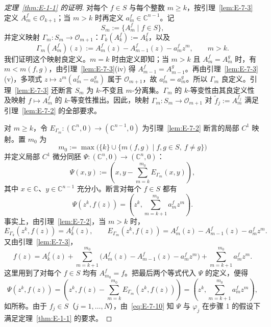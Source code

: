 \begin{proof}[定理~\ref{thm:E-1-1} 的证明]
对每个 $f\in S$ 与每个整数 $m\ge k$，按引理~\ref{lem:E-7-3} 定义 $A_m^f\in\mathcal O_{k+1}$；当 $m>k$ 时再定义 $a_m^f\in\mathbb C^{n-1}$。记
\[
  S_m:=\{A_m^f\mid f\in S\},
\]
并定义映射 $\Gamma_m:S_m\to\mathcal O_{m+1}$：$\Gamma_k(A_k^f):=A_k^f$，以及
\[
  \Gamma_m(A_m^f)(z):=A_m^f(z)-A_{m-1}^f(z)-a_m^fz^m,
  \qquad m>k.
\]
我们证明这个映射良定义。$m=k$ 时由定义即知；当 $m>k$ 且 $A_m^f=A_m^g$ 时，有 $m<m(f,g)$，由引理~\ref{lem:E-7-3}(iv) 得 $A_{m-1}^f=A_{m-1}^g$。再由引理~\ref{lem:E-7-3}(v)，多项式 $z\mapsto z^m(a_m^f-a_m^g)$ 属于 $\mathcal O_{m+1}$，故 $a_m^f=a_m^g$。所以 $\Gamma_m$ 良定义。引理~\ref{lem:E-7-3} 还断言 $S_m$ 为 $k$-不变且 $m$-分离集。$\Gamma_m$ 的 $k$-等变性由其良定义性及映射 $f\mapsto A_m^f$ 的 $k$-等变性推出。因此，映射 $\Gamma_m:S_m\to\mathcal O_{m+1}$ 对 $\widetilde f_j:=A_m^{f_j}$ 满足引理~\ref{lem:E-7-2} 的全部要求。

对 $m\ge k$，令 $E_{\Gamma_m}:(\mathbb C^n,0)\to(\mathbb C^{n-1},0)$ 为引理~\ref{lem:E-7-2} 断言的局部 $C^1$ 映射。置 $m_0$ 为
\[
  m_0:=\max\bigl(\{k\}\cup
    \{m(f,g)\mid f,g\in S,\ f\ne g\}\bigr)
\]
并定义局部 $C^1$ 微分同胚 $\Psi:(\mathbb C^n,0)\to(\mathbb C^n,0)$：
\[
  \Psi(x,y):=\left(x,y-\sum_{m=k}^{m_0}E_{\Gamma_m}(x,y)\right),
\]
其中 $x\in\mathbb C$、$y\in\mathbb C^{n-1}$ 充分小。断言对每个 $f\in S$ 都有
\begin{equation}\label{eq:E-7-10}
  \Psi(z^k,f(z))=
  \left(z^k,\sum_{m=k+1}^{m_0}a_m^fz^m\right).
\end{equation}
事实上，由引理~\ref{lem:E-7-2}，当 $m>k$ 时，
\[
  E_{\Gamma_k}(z^k,f(z))=A_k^f(z),\qquad
  E_{\Gamma_m}(z^k,f(z))
    =A_m^f(z)-A_{m-1}^f(z)-a_m^fz^m.
\]
又由引理~\ref{lem:E-7-3}，
\[
  f(z)=A_k^f(z)+\sum_{m=k+1}^{m_0}
    \bigl(A_m^f(z)-A_{m-1}^f(z)-a_m^fz^m\bigr)
    +\sum_{m=k+1}^{m_0}a_m^fz^m.
\]
这里用到了对每个 $f\in S$ 均有 $A_{m_0}^f=f$。把最后两个等式代入 $\Psi$ 的定义，便得
\[
  \Psi(z^k,f(z))
  =\left(z^k,f(z)-\sum_{m=k}^{m_0}E_{\Gamma_m}(z^k,f(z))\right)
  =\left(z^k,\sum_{m=k+1}^{m_0}a_m^fz^m\right),
\]
如所称。由于 $f_j\in S$（$j=1,\ldots,N$），由~\eqref{eq:E-7-10} 知 $\Psi$ 与 $\varphi_j$ 在步骤 1 的假设下满足定理~\ref{thm:E-1-1} 的要求。


\end{proof}
